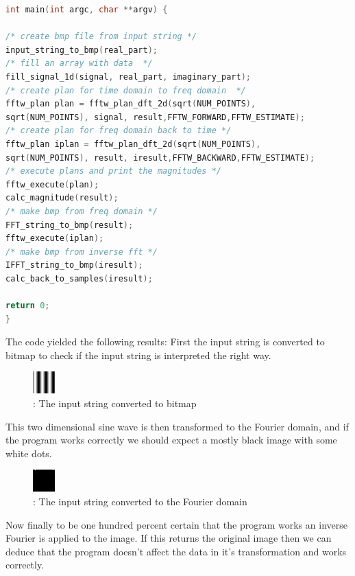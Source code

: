 \documentclass[11pt, A4, oneside]{article}
\begin{document}
\begin{lstlisting}[language=C, caption= FFTW image process main.cpp]
int main(int argc, char **argv) {

/* create bmp file from input string */
input_string_to_bmp(real_part);
/* fill an array with data  */
fill_signal_1d(signal, real_part, imaginary_part);
/* create plan for time domain to freq domain  */
fftw_plan plan = fftw_plan_dft_2d(sqrt(NUM_POINTS),
sqrt(NUM_POINTS), signal, result,FFTW_FORWARD,FFTW_ESTIMATE);
/* create plan for freq domain back to time */
fftw_plan iplan = fftw_plan_dft_2d(sqrt(NUM_POINTS),
sqrt(NUM_POINTS), result, iresult,FFTW_BACKWARD,FFTW_ESTIMATE);
/* execute plans and print the magnitudes */
fftw_execute(plan);
calc_magnitude(result);
/* make bmp from freq domain */
FFT_string_to_bmp(result);
fftw_execute(iplan);
/* make bmp from inverse fft */
IFFT_string_to_bmp(iresult);
calc_back_to_samples(iresult);

return 0;
}

\end{lstlisting}
The code yielded the following results:
First the input string is converted to bitmap to check if the input string is interpreted the right way. 

\begin{figure}[!ht]
	\centering
	\includegraphics[scale=10]{input_string}
	\caption{: The input string converted to bitmap }
	\label{input string}
\end{figure}

This two dimensional sine wave is then transformed to the Fourier domain, and if the program works correctly we should expect a mostly black image with some white dots. 

\begin{figure}[!ht]
	\centering
	\includegraphics[scale=10]{processed_string_frequency_domain}
	\caption{: The input string converted to the Fourier domain}
	\label{processed_string_frequency_domain}
\end{figure}

Now finally to be one hundred percent certain that the program works an inverse Fourier is applied to the image. If this returns the original image then we can deduce that the program doesn't affect the data in it's transformation and works correctly. 
\end{document}
